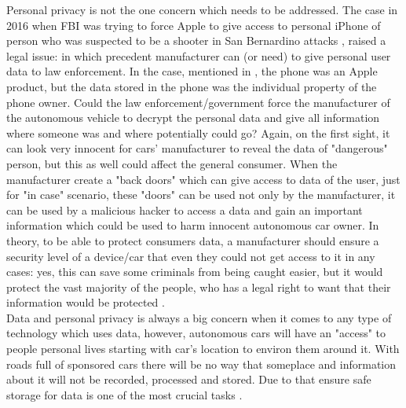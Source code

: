 Personal privacy is not the one concern which needs to be addressed. The case in 2016 when FBI was trying to force Apple to give access to personal iPhone of person who was suspected to be a shooter in San Bernardino attacks \cite{ThreatenPrivacyIII}, raised a legal issue: in which precedent manufacturer can (or need) to give personal user data to law enforcement. In the case, mentioned in \cite{ThreatenPrivacyIII}, the phone was an Apple product, but the data stored in the phone was the individual property of the phone owner. Could the law enforcement/government force the manufacturer of the autonomous vehicle to decrypt the personal data and give all information where someone was and where potentially could go? Again, on the first sight, it can look very innocent for cars' manufacturer to reveal the data of "dangerous" person, but this as well could affect the general consumer. When the manufacturer create a "back doors" which can give access to data of the user, just for "in case" scenario, these "doors" can be used not only by the manufacturer, it can be used by a malicious hacker to access a data and gain an important information which could be used to harm innocent autonomous car owner. In theory, to be able to protect consumers data, a manufacturer should ensure a security level of a device/car that even they could not get access to it in any cases: yes, this can save some criminals from being caught easier, but it would protect the vast majority of the people, who has a legal right to want that their information would be protected \cite{ThreatenPrivacyIV}. \\
Data and personal privacy is always a big concern when it comes to any type of technology which uses data, however, autonomous cars will have an "access" to people personal lives starting with car's location to environ them around it. With roads full of sponsored cars there will be no way that someplace and information about it will not be recorded, processed and stored. Due to that ensure safe storage for data is one of the most crucial tasks \cite{ThreatenPrivacyIV}.